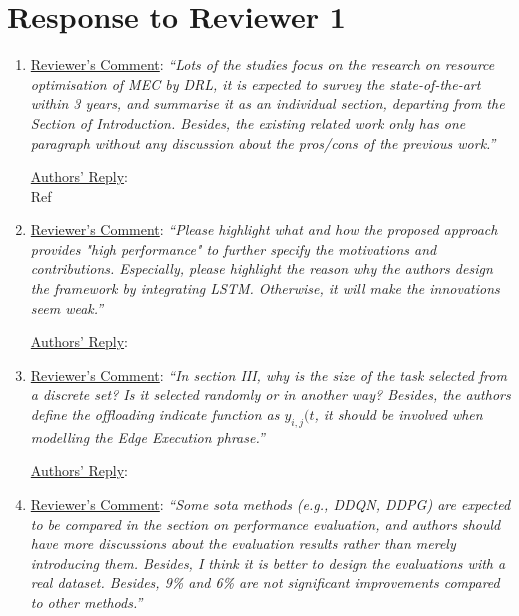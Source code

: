 \documentclass[12pt,draftclsnofoot,onecolumn]{IEEEtran}
\begin{document}
\section{Response to Reviewer 1}
\begin{enumerate}

\item \underline{Reviewer's Comment}: 
\textit{``Lots of the studies focus on the research on resource optimisation of MEC by DRL, it is expected to survey the state-of-the-art within 3 years, and summarise it as an individual section, departing from the Section of Introduction. Besides, the existing related work only has one paragraph without any discussion about the pros/cons of the previous work.''} \newline

\underline{Authors' Reply}:\\

Ref

\item \underline{Reviewer's Comment}: 
\textit{``Please highlight what and how the proposed approach provides "high performance" to further specify the motivations and contributions. Especially, please highlight the reason why the authors design the framework by integrating LSTM. Otherwise, it will make the innovations seem weak.''} \newline

\underline{Authors' Reply}:\\

\item \underline{Reviewer's Comment}: 
\textit{``In section III, why is the size of the task selected from a discrete set? Is it selected randomly or in another way? Besides, the authors define the offloading indicate function as $y_{i,j}(t$, it should be involved when modelling the Edge Execution phrase.''} \newline

\underline{Authors' Reply}:\\

\item \underline{Reviewer's Comment}: 
\textit{``Some sota methods (e.g., DDQN, DDPG) are expected to be compared in the section on performance evaluation, and authors should have more discussions about the evaluation results rather than merely introducing them. Besides, I think it is better to design the evaluations with a real dataset. Besides, 9\% and 6\% are not significant improvements compared to other methods.''} \newline


\end{enumerate}
\end{document}
